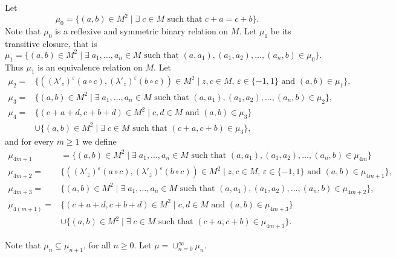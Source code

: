 \documentclass[10pt]{article}
\begin{document}
Let
$$\mu_0=\{ (a,b)\in M^2\mid \exists\; c\in M \mbox{ such that } c+a=c+b\}.$$
Note that $\mu_0$ is a reflexive and symmetric binary relation on
$M$. Let $\mu_1$ be its transitive closure, that is
$$\mu_1=\{(a,b)\in M^2\mid \exists\;  a_1,\dots,a_n\in M \mbox{ such that }(a,a_1),(a_1,a_2),\dots ,(a_n,b)\in \mu_0\}.$$
Thus $\mu_1$ is an equivalence relation on $M$. Let
\begin{align*}\mu_2=&\{ ((\lambda'_{z})^{\varepsilon}(a\circ c),(\lambda'_{z})^{\varepsilon}(b\circ c))\in M^2\mid z,c\in M,\, \varepsilon\in \{ -1,1\}\mbox{ and }(a,b)\in \mu_1\} ,\\
	\mu_3=&\{(a,b)\in M^2\mid \exists\; a_1,\dots,a_n\in M \mbox{ such that }(a,a_1),(a_1,a_2),\dots ,(a_n,b)\in \mu_2\},\\
	\mu_4=&\{(c+a+d,c+b+d)\in M^2\mid c,d\in M \mbox{ and } (a,b)\in \mu_3\}\\
	&\cup \{ (a,b)\in M^2\mid \exists\; c\in M\mbox{ such that
	}(c+a,c+b)\in \mu_3\}, 
\end{align*}
and for every $m\geq 1$ we
define
\begin{align*}\mu_{4m+1}&=\{(a,b)\in M^2\mid \exists\; a_1,\dots,a_n\in M \mbox{ such that }(a,a_1),(a_1,a_2),\dots ,(a_n,b)\in \mu_{4m}\}\\
	\mu_{4m+2}=&\{ ((\lambda'_{z})^{\varepsilon}(a\circ c),(\lambda'_{z})^{\varepsilon}(b\circ c))\in M^2\mid z,c\in M,\, \varepsilon\in\{ -1,1\}\mbox{ and }(a,b)\in \mu_{4m+1}\} ,\\
	\mu_{4m+3}=&\{(a,b)\in M^2\mid \exists\; a_1,\dots,a_n\in M \mbox{ such that }(a,a_1),(a_1,a_2),\dots ,(a_n,b)\in \mu_{4m+2}\},\\
	\mu_{4(m+1)}=&\{(c+a+d,c+b+d)\in M^2\mid c,d\in M \mbox{ and } (a,b)\in \mu_{4m+3}\}\\
	&\cup \{ (a,b)\in M^2\mid \exists\; c\in M\mbox{ such that
	}(c+a,c+b)\in \mu_{4m+3}\}.
\end{align*}

Note that
$\mu_n\subseteq\mu_{n+1}$, for all $n\geq 0$. Let
$\mu=\cup_{n=0}^{\infty}\mu_n$.
\end{document}
